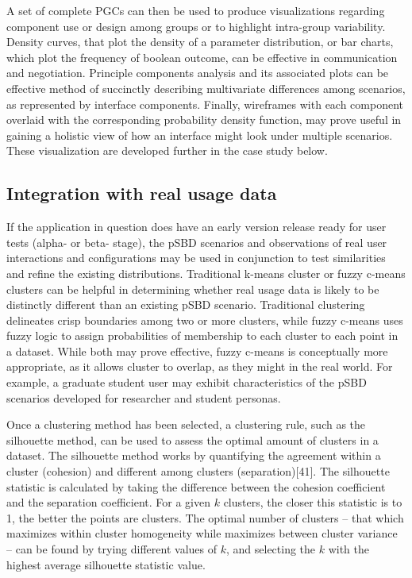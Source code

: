 \documentclass[]{article}
\begin{document}
A set of complete PGCs can then be used to produce visualizations
regarding component use or design among groups or to highlight
intra-group variability. Density curves, that plot the density of a
parameter distribution, or bar charts, which plot the frequency of
boolean outcome, can be effective in communication and negotiation.
Principle components analysis and its associated plots can be effective
method of succinctly describing multivariate differences among
scenarios, as represented by interface components. Finally, wireframes
with each component overlaid with the corresponding probability density
function, may prove useful in gaining a holistic view of how an
interface might look under multiple scenarios. These visualization are
developed further in the case study below.

\subsection{Integration with real usage
data}\label{integration-with-real-usage-data}

If the application in question does have an early version release ready
for user tests (alpha- or beta- stage), the pSBD scenarios and
observations of real user interactions and configurations may be used in
conjunction to test similarities and refine the existing distributions.
Traditional k-means cluster or fuzzy c-means clusters can be helpful in
determining whether real usage data is likely to be distinctly different
than an existing pSBD scenario. Traditional clustering delineates crisp
boundaries among two or more clusters, while fuzzy c-means uses fuzzy
logic to assign probabilities of membership to each cluster to each
point in a dataset. While both may prove effective, fuzzy c-means is
conceptually more appropriate, as it allows cluster to overlap, as they
might in the real world. For example, a graduate student user may
exhibit characteristics of the pSBD scenarios developed for researcher
and student personas.

Once a clustering method has been selected, a clustering rule, such as
the silhouette method, can be used to assess the optimal amount of
clusters in a dataset. The silhouette method works by quantifying the
agreement within a cluster (cohesion) and different among clusters
(separation){[}41{]}. The silhouette statistic is calculated by taking
the difference between the cohesion coefficient and the separation
coefficient. For a given \(k\) clusters, the closer this statistic is to
1, the better the points are clusters. The optimal number of clusters --
that which maximizes within cluster homogeneity while maximizes between
cluster variance -- can be found by trying different values of \(k\),
and selecting the \(k\) with the highest average silhouette statistic
value.
\end{document}
